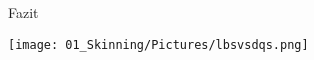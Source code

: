 						\begin{frame}{
								\begin{figure}
									\colorbox{black!10}{\Huge{Fazit}}
								\end{figure}
							}
							
							\begin{figure}
								\texttt{[image: 01\_Skinning/Pictures/lbsvsdqs.png]}
							\end{figure}
							
							
							
						\end{frame}
		
		
	